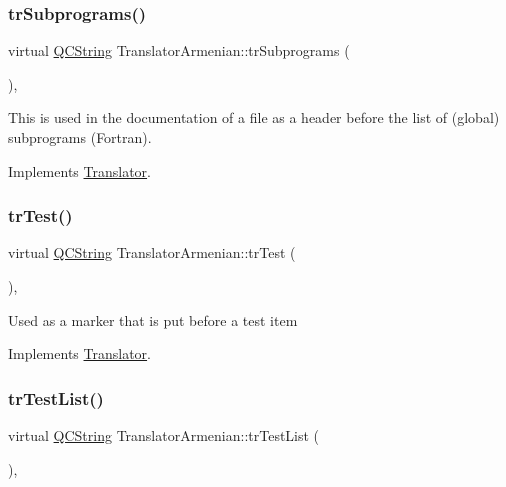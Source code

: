 \subsubsection{\texorpdfstring{trSubprograms()}{trSubprograms()}}
{\footnotesize\ttfamily virtual \mbox{\hyperlink{class_q_c_string}{Q\+C\+String}} Translator\+Armenian\+::tr\+Subprograms (\begin{DoxyParamCaption}{ }\end{DoxyParamCaption})\hspace{0.3cm}{\ttfamily [inline]}, {\ttfamily [virtual]}}

This is used in the documentation of a file as a header before the list of (global) subprograms (Fortran). 

Implements \mbox{\hyperlink{class_translator}{Translator}}.

\mbox{\label{class_translator_armenian_ae17d1607e538439801ee350da37f1183}} 
\subsubsection{\texorpdfstring{trTest()}{trTest()}}
{\footnotesize\ttfamily virtual \mbox{\hyperlink{class_q_c_string}{Q\+C\+String}} Translator\+Armenian\+::tr\+Test (\begin{DoxyParamCaption}{ }\end{DoxyParamCaption})\hspace{0.3cm}{\ttfamily [inline]}, {\ttfamily [virtual]}}

Used as a marker that is put before a test item 

Implements \mbox{\hyperlink{class_translator}{Translator}}.

\mbox{\label{class_translator_armenian_aa75b43ec027290118fb77553194e90f8}} 
\subsubsection{\texorpdfstring{trTestList()}{trTestList()}}
{\footnotesize\ttfamily virtual \mbox{\hyperlink{class_q_c_string}{Q\+C\+String}} Translator\+Armenian\+::tr\+Test\+List (\begin{DoxyParamCaption}{ }\end{DoxyParamCaption})\hspace{0.3cm}{\ttfamily [inline]}, {\ttfamily [virtual]}}

